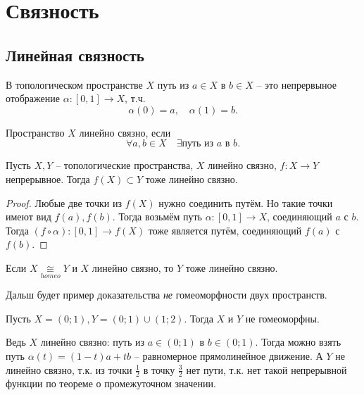 \date{15 января 2025}

\section{Связность}

\subsection{Линейная связность}

\begin{definition}
    [Путь]
    В топологическом пространстве $X$ путь из $a\in X$ в $b\in X$ -- это непрервыное отображение $\alpha\colon [0,1]\to X$, т.ч. $$\alpha(0) = a, \quad\alpha(1)=b.$$ 
\end{definition}

\begin{definition}
    Пространство $X$ линейно связно, если \[\forall a,b\in X \quad \exists\text{путь из }a \text{ в }b.\]
\end{definition}

\begin{theorem}
    Пусть $X, Y$ -- топологические пространства, $X$ линейно связно, $f\colon X\to Y$ непрерывное. Тогда $f(X) \subset Y$ тоже линейно связно. 
\end{theorem}
\begin{proof}
    Любые две точки из $f(X)$ нужно соединить путём. Но такие точки имеют вид $f(a), f(b)$. Тогда возьмём путь $\alpha\colon[0,1]\to X$, соединяющий $a$ с $b$. Тогда $(f\circ \alpha)\colon[0,1]\to f(X)$ тоже является путём, соединяющий $f(a)$ с $f(b)$.
\end{proof}
\begin{corollary}
    Если $X\underset{homeo}{\cong} Y$ и $X$ линейно связно, то $Y$ тоже линейно связно.
\end{corollary}

Дальш будет пример доказательства \emph{не} гомеоморфности двух пространств.

\begin{example}
    Пусть $X = (0;1), Y = (0;1) \cup (1;2)$. Тогда $X$ и $Y$ не гомеоморфны. 
    
    Ведь $X$ линейно связно: путь из $a \in (0;1)$ в $b \in (0;1)$. Тогда можно взять путь $\alpha(t) = (1-t)a+tb$ -- равномерное прямолинейное движение. А $Y$ не линейно связно, т.к. из точки $\frac 1 2$ в точку $\frac 3 2$ нет пути, т.к. нет такой непрерывной функции по теореме о промежуточном значении.
\end{example}

